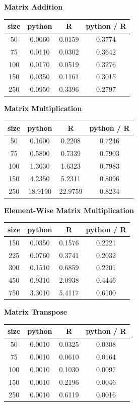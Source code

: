 \documentclass[%
  final,
  notitlepage,
  narroweqnarray,
  inline,
]{ieee}
\begin{document}
\begin{center}
  \vspace{1em}
    \textbf{Matrix Addition} \\
\begin{tabular}{cccc}
size  & python  &  R       & python / R \\
  \hline
50  & 0.0060 & 0.0159 & 0.3774 \\
75  & 0.0110 & 0.0302 & 0.3642 \\
100 & 0.0170 & 0.0519 & 0.3276 \\
150 & 0.0350 & 0.1161 & 0.3015 \\
250 & 0.0950 & 0.3396 & 0.2797 \\
\end{tabular}

\vspace{1em}
    \textbf{Matrix Multiplication} \\
\begin{tabular}{cccc}
size  & python  &  R       & python / R \\
  \hline
50  & 0.1600  & 0.2208  & 0.7246 \\
75  & 0.5800  & 0.7339  & 0.7903 \\
100 & 1.3030  & 1.6323  & 0.7983 \\
150 & 4.2350  & 5.2311  & 0.8096 \\
250 & 18.9190 & 22.9759 & 0.8234 \\
\end{tabular}

\vspace{1em}
    \textbf{Element-Wise Matrix Multiplication} \\
\begin{tabular}{cccc}
size  & python  &  R       & python / R \\
  \hline
150   & 0.0350  &  0.1576  &  0.2221 \\
225   & 0.0760  &  0.3741  &  0.2032 \\
300   & 0.1510  &  0.6859  &  0.2201 \\
450   & 0.9310  &  2.0938  &  0.4446 \\
750   & 3.3010  &  5.4117  &  0.6100 \\
\end{tabular}

\vspace{1em}
    \textbf{Matrix Transpose} \\
\begin{tabular}{cccc}
size  & python  &  R       & python / R \\
  \hline
50  & 0.0010  & 0.0325 & 0.0308 \\
75  & 0.0010  & 0.0610 & 0.0164 \\
100 & 0.0010  & 0.1030 & 0.0097 \\
150 & 0.0010  & 0.2196 & 0.0046 \\
250 & 0.0010  & 0.6119 & 0.0016 \\
\end{tabular}


\end{center}
\end{document}
